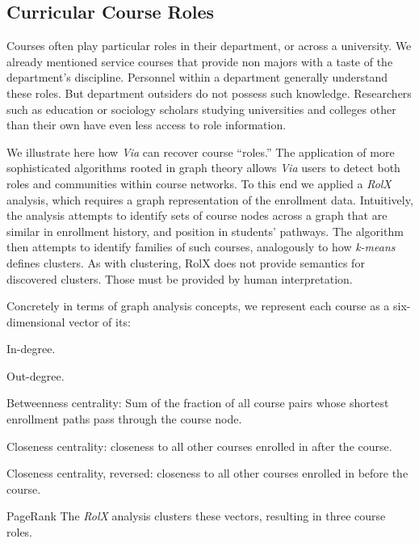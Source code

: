 \subsection{Curricular Course Roles}
\label{sec:rolx}
Courses often play particular roles in their department, or across a
university. We already mentioned service courses that provide non
majors with a taste of the department's discipline. Personnel within a
department generally understand these roles. But department outsiders
do not possess such knowledge. Researchers such as education or
sociology scholars studying universities and colleges other than their
own have even less access to role information.

We illustrate here how {\em Via} can recover course ``roles.'' The
application of more sophisticated algorithms rooted in graph theory
allows {\em Via} users to detect both roles and communities within
course networks. To this end we applied a {\em RolX}
\cite{Henderson2012} analysis, which requires a graph representation of the enrollment data. Intuitively, the analysis attempts to identify sets of course
nodes across a graph that are similar in enrollment history, and
position in students' pathways. The algorithm then attempts to
identify families of such courses, analogously to how {\em k-means}
defines clusters. As with clustering, RolX does not provide semantics
for discovered clusters. Those must be provided by human
interpretation.

Concretely in terms of graph analysis concepts, we represent each
course as a six-dimensional vector of its:
\squishlist  %
  \item In-degree.
  \item Out-degree.
  \item Betweenness centrality: Sum of the fraction of all course pairs
    whose shortest enrollment paths pass through the course node.
  \item Closeness centrality: closeness to all other courses enrolled
    in after the course.
  \item Closeness centrality, reversed: closeness to all other courses
    enrolled in before the course.
  \item PageRank
\squishend
The {\em RolX} analysis clusters these vectors, resulting in three
course roles. 


